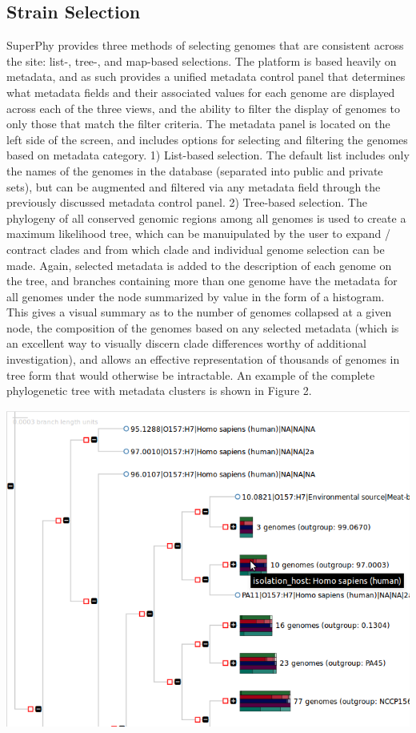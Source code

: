 \documentclass[doublespacing, linenumbers]{bmcart}
\begin{document}
\subsection{Strain Selection}
SuperPhy provides three methods of selecting genomes that are consistent across the site: list-, tree-, and map-based selections. The platform is based heavily on metadata, and as such provides a unified metadata control panel that determines what metadata fields and their associated values for each genome are displayed across each of the three views, and the ability to filter the display of genomes to only those that match the filter criteria. The metadata panel is located on the left side of the screen, and includes options for selecting and filtering the genomes based on metadata category.
 1) List-based selection. The default list includes only the names of the genomes in the database (separated into public and private sets), but can be augmented and filtered via any metadata field through the previously discussed metadata control panel.
 2) Tree-based selection. The phylogeny of all conserved genomic regions among all genomes is used to create a maximum likelihood tree, which can be manuipulated by the user to expand / contract clades and from which clade and individual genome selection can be made. Again, selected metadata is added to the description of each genome on the tree, and branches containing more than one genome have the metadata for all genomes under the node summarized by value in the form of a histogram. This gives a visual summary as to the number of genomes collapsed at a given node, the composition of the genomes based on any selected metadata (which is an excellent way to visually discern clade differences worthy of additional investigation), and allows an effective representation of thousands of genomes in tree form that would otherwise be intractable. An example of the complete phylogenetic tree with metadata clusters is shown in Figure 2.

\includegraphics[width=\textwidth]{images/superphy_tree_tooltip.png}
\end{document}

